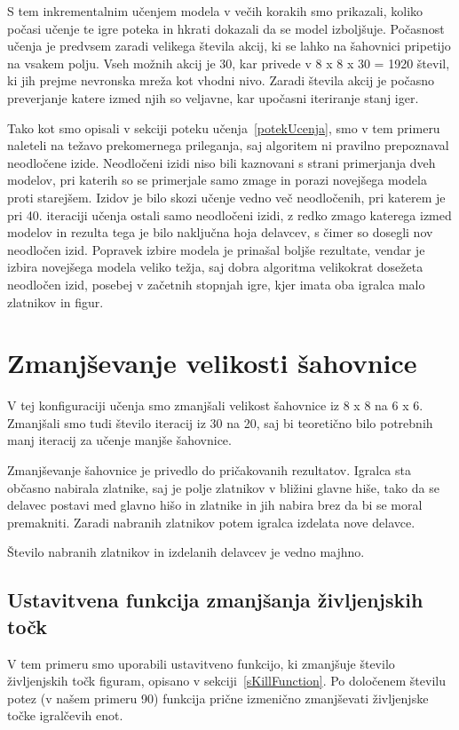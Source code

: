\documentclass[a4paper, 12pt]{book}
\begin{document}
S tem inkrementalnim učenjem modela v večih korakih smo prikazali, koliko počasi učenje te igre poteka in hkrati dokazali da se model izboljšuje.
Počasnost učenja je predvsem zaradi velikega števila akcij, ki se lahko na šahovnici pripetijo na vsakem polju.
Vseh možnih akcij je 30, kar privede v 8 x 8 x 30 = 1920 števil, ki jih prejme nevronska mreža kot vhodni nivo.
Zaradi števila akcij je počasno preverjanje katere izmed njih so veljavne, kar upočasni iteriranje stanj iger.

Tako kot smo opisali v sekciji poteku učenja~\ref{potekUcenja}, smo v tem primeru naleteli na težavo prekomernega prileganja, saj algoritem ni pravilno prepoznaval neodločene izide.
Neodločeni izidi niso bili kaznovani s strani primerjanja dveh modelov, pri katerih so se primerjale samo zmage in porazi novejšega modela proti starejšem.
Izidov je bilo skozi učenje vedno več neodločenih, pri katerem je pri 40. iteraciji učenja ostali samo neodločeni izidi, z redko zmago katerega izmed modelov in rezulta tega je bilo naključna hoja delavcev, s čimer so dosegli nov neodločen izid.
Popravek izbire modela je prinašal boljše rezultate, vendar je izbira novejšega modela veliko težja, saj dobra algoritma velikokrat dosežeta neodločen izid, posebej v začetnih stopnjah igre, kjer imata oba igralca malo zlatnikov in figur.
\section{Zmanjševanje velikosti šahovnice}
\label{resultFourth}

V tej konfiguraciji učenja smo zmanjšali velikost šahovnice iz 8 x 8 na 6 x 6.
Zmanjšali smo tudi število iteracij iz 30 na 20, saj bi teoretično bilo potrebnih manj iteracij za učenje manjše šahovnice.

Zmanjševanje šahovnice je privedlo do pričakovanih rezultatov.
Igralca sta občasno nabirala zlatnike, saj je polje zlatnikov v bližini glavne hiše, tako da se delavec postavi med glavno hišo in zlatnike in jih nabira brez da bi se moral premakniti.
Zaradi nabranih zlatnikov potem igralca izdelata nove delavce.

Število nabranih zlatnikov in izdelanih delavcev je vedno majhno.

\subsection{Ustavitvena funkcija zmanjšanja življenjskih točk}

V tem primeru smo uporabili ustavitveno funkcijo, ki zmanjšuje število življenjskih točk figuram, opisano v sekciji~\ref{sKillFunction}.
Po določenem številu potez (v našem primeru 90) funkcija prične izmenično zmanjševati življenjske točke igralčevih enot.
\end{document}
